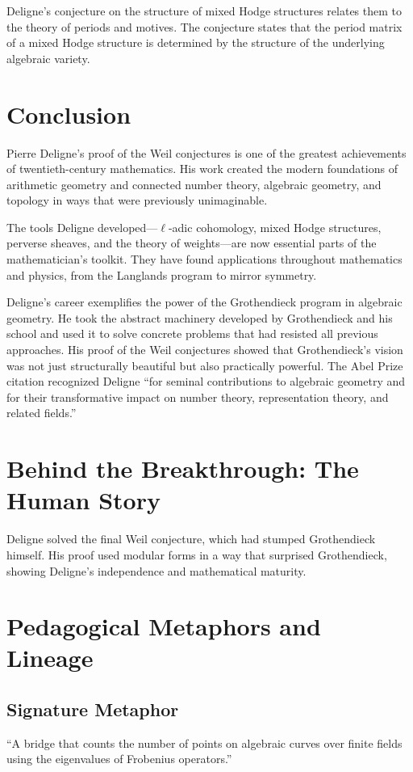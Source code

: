 Deligne's conjecture on the structure of mixed Hodge structures relates them to the theory of periods and motives. The conjecture states that the period matrix of a mixed Hodge structure is determined by the structure of the underlying algebraic variety.

\section{Conclusion}

Pierre Deligne's proof of the Weil conjectures is one of the greatest achievements of twentieth-century mathematics. His work created the modern foundations of arithmetic geometry and connected number theory, algebraic geometry, and topology in ways that were previously unimaginable.

The tools Deligne developed---$\ell$-adic cohomology, mixed Hodge structures, perverse sheaves, and the theory of weights---are now essential parts of the mathematician's toolkit. They have found applications throughout mathematics and physics, from the Langlands program to mirror symmetry.

Deligne's career exemplifies the power of the Grothendieck program in algebraic geometry. He took the abstract machinery developed by Grothendieck and his school and used it to solve concrete problems that had resisted all previous approaches. His proof of the Weil conjectures showed that Grothendieck's vision was not just structurally beautiful but also practically powerful. The Abel Prize citation recognized Deligne ``for seminal contributions to algebraic geometry and for their transformative impact on number theory, representation theory, and related fields.''

\section{Behind the Breakthrough: The Human Story}
Deligne solved the final Weil conjecture, which had stumped Grothendieck himself. His proof used modular forms in a way that surprised Grothendieck, showing Deligne's independence and mathematical maturity.

\section{Pedagogical Metaphors and Lineage}
\subsection{Signature Metaphor}
``A bridge that counts the number of points on algebraic curves over finite fields using the eigenvalues of Frobenius operators.''

